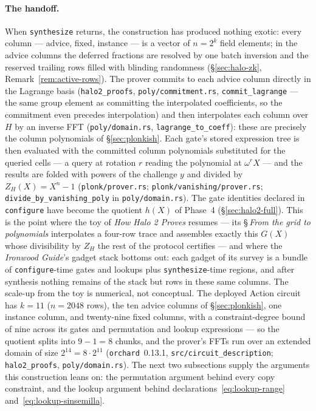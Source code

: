 \documentclass[11pt,a4paper]{article}
\theoremstyle{definition}
\begin{document}
\paragraph{The handoff.}
When \texttt{synthesize} returns, the construction has produced nothing
exotic: every column --- advice, fixed, instance --- is a vector of
$n = 2^k$ field elements; in the advice columns the deferred fractions are
resolved by one batch inversion and the reserved trailing rows filled with
blinding randomness (\S\ref{sec:halo-zk}, Remark~\ref{rem:active-rows}).
The prover commits to
each advice column directly in the Lagrange basis
(\texttt{halo2\_proofs}, \texttt{poly/commitment.rs},
\texttt{commit\_lagrange} --- the same group element as committing the
interpolated coefficients, so the commitment even precedes interpolation)
and then interpolates each column over $H$ by an inverse FFT
(\texttt{poly/domain.rs}, \texttt{lagrange\_to\_coeff}): these are
precisely the column polynomials of \S\ref{sec:plonkish}. Each gate's
stored expression tree is then evaluated with the committed column
polynomials substituted for the queried cells --- a query at rotation $r$
reading the polynomial at $\omega^r X$ --- and the results are folded with
powers of the challenge $y$ and divided by $Z_H(X) = X^n - 1$
(\texttt{plonk/prover.rs}; \texttt{plonk/vanishing/prover.rs};
\texttt{divide\_by\_vanishing\_poly} in \texttt{poly/domain.rs}). The gate
identities declared in \texttt{configure} have become the quotient $h(X)$
of Phase~4 (\S\ref{sec:halo2-full}). This is the point where the toy of
\emph{How Halo 2 Proves} resumes --- its \S\,\emph{From the grid to
polynomials} interpolates a four-row trace and assembles exactly this
$G(X)$ whose divisibility by $Z_H$ the rest of the protocol certifies ---
and where the \emph{Ironwood Guide}'s gadget stack bottoms out: each gadget
of its survey is a bundle of \texttt{configure}-time gates and lookups plus
\texttt{synthesize}-time regions, and after synthesis nothing remains of
the stack but rows in these same columns. The scale-up from the toy is
numerical, not conceptual. The deployed Action circuit has $k = 11$
($n = 2048$ rows), the ten advice columns of \S\ref{sec:plonkish}, one
instance column, and twenty-nine fixed columns, with a constraint-degree
bound of nine across
its gates and permutation and lookup expressions --- so the quotient splits
into $9 - 1 = 8$ chunks, and the prover's FFTs run over an extended domain
of size $2^{14} = 8 \cdot 2^{11}$ (\texttt{orchard}~0.13.1,
\texttt{src/circuit\_description}; \texttt{halo2\_proofs},
\texttt{poly/domain.rs}). The next two subsections supply the arguments
this construction leans on: the permutation argument behind every copy
constraint, and the lookup argument behind
declarations~\eqref{eq:lookup-range}
and~\eqref{eq:lookup-sinsemilla}.
\end{document}
